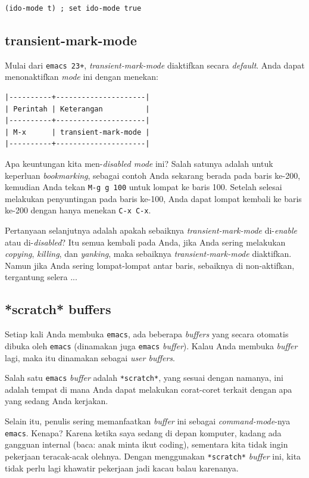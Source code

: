\documentclass{article}
\begin{document}
\begin{verbatim}
(ido-mode t) ; set ido-mode true
\end{verbatim}

\subsection{transient-mark-mode}
Mulai dari \verb=emacs 23+=, \emph{transient-mark-mode} diaktifkan secara 
\emph{default}. Anda dapat menonaktifkan \emph{mode} ini dengan menekan:

\begin{verbatim}
|----------+---------------------|
| Perintah | Keterangan          |
|----------+---------------------|
| M-x      | transient-mark-mode |
|----------+---------------------|
\end{verbatim}

Apa keuntungan kita men-\emph{disabled mode} ini? Salah satunya adalah untuk
keperluan \emph{bookmarking}, sebagai contoh Anda sekarang berada pada baris
ke-200, kemudian Anda tekan \verb=M-g g 100= untuk lompat ke baris 100. 
Setelah selesai melakukan penyuntingan pada baris ke-100, Anda dapat lompat
kembali ke baris ke-200 dengan hanya menekan \verb=C-x C-x=.

Pertanyaan selanjutnya adalah apakah sebaiknya \emph{transient-mark-mode}
di-\emph{enable} atau di-\emph{disabled}? Itu semua kembali pada Anda, jika
Anda sering melakukan \emph{copying}, \emph{killing}, dan \emph{yanking}, maka
sebaiknya \emph{transient-mark-mode} diaktifkan. Namun jika Anda sering 
lompat-lompat antar baris, sebaiknya di non-aktifkan, tergantung selera ... 

\subsection{*scratch* buffers}
Setiap kali Anda membuka \verb=emacs=, ada beberapa \emph{buffers} yang secara
otomatis dibuka oleh \verb=emacs= (dinamakan juga \verb=emacs= \emph{buffer}).
Kalau Anda membuka \emph{buffer} lagi, maka itu dinamakan sebagai 
\emph{user buffers}.

Salah satu \verb=emacs= \emph{buffer} adalah \verb=*scratch*=, yang sesuai
dengan namanya, ini adalah tempat di mana Anda dapat melakukan corat-coret
terkait dengan apa yang sedang Anda kerjakan. 

Selain itu, penulis sering memanfaatkan \emph{buffer} ini sebagai 
\emph{command-mode}-nya \verb=emacs=. Kenapa? Karena ketika saya sedang di
depan komputer, kadang ada gangguan internal (baca: anak minta ikut coding),
sementara kita tidak ingin pekerjaan teracak-acak olehnya. Dengan menggunakan
\verb=*scratch*= \emph{buffer} ini, kita tidak perlu lagi khawatir pekerjaan
jadi kacau balau karenanya.
\end{document}
